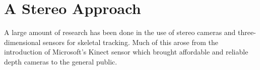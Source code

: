 \section{A Stereo Approach}

A large amount of research has been done in the use of stereo cameras and three-dimensional sensors for skeletal tracking. Much of this arose from the introduction of Microsoft's Kinect\cite{kinect} sensor which brought affordable and reliable depth cameras to the general public.





